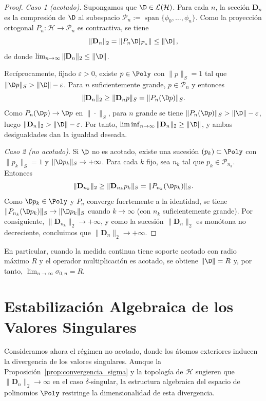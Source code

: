 \begin{proof}
	\emph{Caso 1 (acotado).} Supongamos que $\D\in\mathcal{L}(\mathcal{H})$. Para cada $n$, la sección $\mathbf{D}_n$ es la compresión de $\D$ al subespacio $\mathcal{P}_n:=\operatorname{span}\{\phi_0,\dots,\phi_n\}$. Como la proyección ortogonal $P_n:\mathcal{H}\to\mathcal{P}_n$ es contractiva, se tiene
	\[
		\|\mathbf{D}_n\|_2=\|P_n\D|_{\mathcal{P}_n}\|\le\|\D\|,
	\]
	de donde $\lim_{n\to\infty}\|\mathbf{D}_n\|_2\le\|\D\|$.

	Recíprocamente, fijado $\varepsilon>0$, existe $p\in\Poly$ con $\|p\|_S=1$ tal que $\|\D p\|_S>\|\D\|-\varepsilon$. Para $n$ suficientemente grande, $p\in\mathcal{P}_n$ y entonces
	\[
		\|\mathbf{D}_n\|_2\ge\|\mathbf{D}_n p\|_S=\|P_n(\D p)\|_S.
	\]
	Como $P_n(\D p)\to\D p$ en $\|\cdot\|_S$, para $n$ grande se tiene $\|P_n(\D p)\|_S>\|\D\|-\varepsilon$, luego $\|\mathbf{D}_n\|_2>\|\D\|-\varepsilon$. Por tanto, $\liminf_{n\to\infty}\|\mathbf{D}_n\|_2\ge\|\D\|$, y ambas desigualdades dan la igualdad deseada.

	\emph{Caso 2 (no acotado).} Si $\D$ no es acotado, existe una sucesión $(p_k)\subset\Poly$ con $\|p_k\|_S=1$ y $\|\D p_k\|_S\to+\infty$. Para cada $k$ fijo, sea $n_k$ tal que $p_k\in\mathcal{P}_{n_k}$. Entonces
	\[
		\|\mathbf{D}_{n_k}\|_2\ge\|\mathbf{D}_{n_k}p_k\|_S=\|P_{n_k}(\D p_k)\|_S.
	\]
	Como $\D p_k\in\Poly$ y $P_n$ converge fuertemente a la identidad, se tiene $\|P_{n_k}(\D p_k)\|_S\to\|\D p_k\|_S$ cuando $k\to\infty$ (con $n_k$ suficientemente grande). Por consiguiente, $\|\mathbf{D}_{n_k}\|_2\to+\infty$, y como la sucesión $\|\mathbf{D}_n\|_2$ es monótona no decreciente, concluimos que $\|\mathbf{D}_n\|_2\to+\infty$.
\end{proof}

En particular, cuando la medida continua tiene soporte acotado con radio máximo $R$ y el operador multiplicación es acotado, se obtiene $\|\D\| = R$ y, por tanto, $\lim_{n \to \infty} \sigma_{0,n} = R$.

\section{Estabilización Algebraica de los Valores Singulares}

Consideramos ahora el régimen no acotado, donde los átomos exteriores inducen la divergencia de los valores singulares. Aunque la Proposición~\ref{prop:convergencia_sigma} y la topología de $\mathcal{H}$ sugieren que $\|\mathbf{D}_n\|_2 \to \infty$ en el caso $\delta$-singular, la estructura algebraica del espacio de polinomios $\Poly$ restringe la dimensionalidad de esta divergencia.

